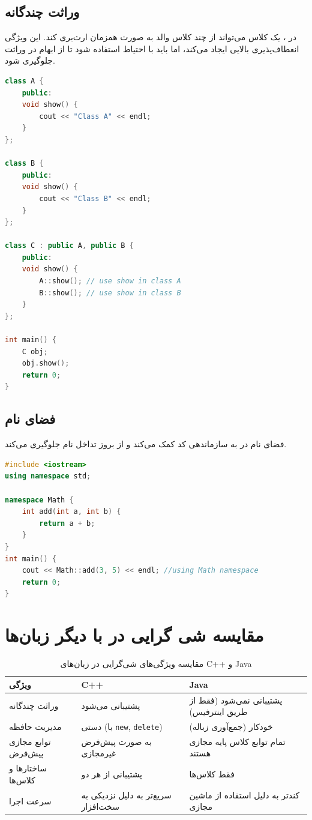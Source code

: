 \documentclass[12pt, a4paper]{report}
\begin{document}
\subsection{وراثت چندگانه}
در ، یک کلاس می‌تواند از چند کلاس والد به صورت همزمان ارث‌بری کند. این ویژگی انعطاف‌پذیری بالایی ایجاد می‌کند، اما باید با احتیاط استفاده شود تا از ابهام در وراثت جلوگیری شود.
\LTR
\begin{lstlisting}[language=C++, breaklines=true]
class A {
	public:
	void show() {
		cout << "Class A" << endl;
	}
};

class B {
	public:
	void show() {
		cout << "Class B" << endl;
	}
};

class C : public A, public B {
	public:
	void show() {
		A::show(); // use show in class A
		B::show(); // use show in class B
	}
};

int main() {
	C obj;
	obj.show();
	return 0;
}

\end{lstlisting}
\RTL

\subsection{فضای نام}
فضای نام در به سازماندهی کد کمک می‌کند و از بروز تداخل نام جلوگیری می‌کند.
\LTR
\begin{lstlisting}[language=C++, breaklines=true]
#include <iostream>
using namespace std;

namespace Math {
	int add(int a, int b) {
		return a + b;
	}
}
int main() {
	cout << Math::add(3, 5) << endl; //using Math namespace
	return 0;
}

\end{lstlisting}
\RTL

\section{مقایسه شی گرایی در  با دیگر زبان‌ها}
\begin{table}[H]
	\centering
	\begin{tabular}{|p{4cm}|p{3cm}|p{7cm}|}
		\hline
		\textbf{ویژگی} & \textbf{C++} & \textbf{Java} \\
		\hline
		وراثت چندگانه &
		پشتیبانی می‌شود &
		پشتیبانی نمی‌شود (فقط از طریق اینترفیس) \\
		\hline
		مدیریت حافظه &
		دستی (با \texttt{new}, \texttt{delete}) &
		خودکار (جمع‌آوری زباله) \\
		\hline
		توابع مجازی پیش‌فرض &
		به صورت پیش‌فرض غیرمجازی &
		تمام توابع کلاس پایه مجازی هستند \\
		\hline
		ساختارها و کلاس‌ها &
		پشتیبانی از هر دو &
		فقط کلاس‌ها \\
		\hline
		سرعت اجرا &
		سریع‌تر به دلیل نزدیکی به سخت‌افزار &
		کندتر به دلیل استفاده از ماشین مجازی \\
		\hline
	\end{tabular}
	\caption{مقایسه ویژگی‌های شی‌گرایی در زبان‌های C++ و Java}
	\label{tab:cpp_vs_java}
\end{table}
\end{document}

